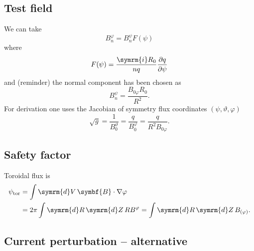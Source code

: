 \documentclass[a4paper, 10pt, english]{article}
\let\temp\vartheta
\let\vartheta\theta
\let\theta\temp
\let\temp\varphi
\let\varphi\phi
\let\phi\temp
\let\vec\symbf
\newcommand*\diff{\ensuremath{\symrm{d}}}  %
\newcommand*\im{\ensuremath{\symrm{i}}}  %
\newcommand*\pd[2][]{\ensuremath{\frac{\partial #1}{\partial #2}}}  %
\newcommand*\tor{\ensuremath{\textrm{tor}}}  %
\begin{document}
\subsection{Test field}

We can take
\[
  B_{n}^{\phi} = B_{n}^{\psi} F(\psi)
\]
where 
\[
  F(\psi) = \frac{\im R_{0}}{n q} \pd[q]{\psi}
\]
and (reminder) the normal component has been chosen as 
\[
  B_{n}^{\psi} = \frac{B_{0 \phi} R_{0}}{R^{2}}.
\]
For derivation one uses the Jacobian of symmetry flux coordinates $(\psi, \theta, \phi)$ 
\[
  \sqrt{g} = \frac{1}{B_{0}^{\theta}} = \frac{q}{B_{0}^{\phi}} = \frac{q}{R^{2} B_{0 \phi}}.
\]

\subsection{Safety factor}

Toroidal flux is
\begin{align}
  \psi_{\tor} &= \int \diff V \, \vec{B} \cdot \nabla \phi \nonumber \\
  &= 2 \pi \int \diff R \, \diff Z \, R B^{\phi} = \int \diff R \, \diff Z \, B_{(\phi)}.
\end{align}

\subsection{Current perturbation -- alternative}
\end{document}
